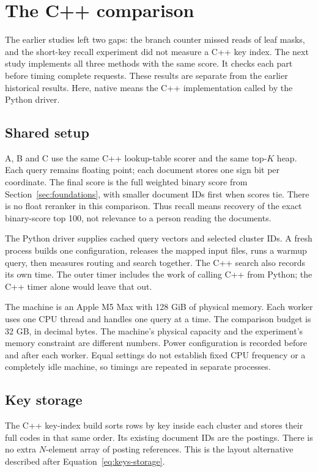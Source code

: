\section{The C++ comparison}
\label{sec:implemented-study}
The earlier studies left two gaps: the branch counter missed reads of leaf masks, and the
short-key recall experiment did not measure a C++ key index. The next study implements all
three methods with the same score. It checks each part before timing complete requests.
These results are separate from the earlier historical results. Here, native means the C++
implementation called by the Python driver.

\subsection{Shared setup}
A, B and C use the same C++ lookup-table scorer and the same top-$K$ heap. Each query remains
floating point; each document stores one sign bit per coordinate. The final score is the full
weighted binary score from Section~\ref{sec:foundations}, with smaller document IDs first when
scores tie. There is no float reranker in this comparison. Thus recall means recovery of the
exact binary-score top 100, not relevance to a person reading the documents.

The Python driver supplies cached query vectors and selected cluster IDs. A fresh process
builds one configuration, releases the mapped input files, runs a warmup query, then measures
routing and search together. The C++ search also records its own time. The outer timer includes
the work of calling C++ from Python; the C++ timer alone would leave that out.

The machine is an Apple M5 Max with 128 GiB of physical memory. Each worker uses one CPU
thread and handles one query at a time. The comparison budget is 32 GB, in decimal bytes.
The machine's physical capacity and the experiment's memory constraint are different numbers.
Power configuration is recorded before and after each worker. Equal settings do not establish
fixed CPU frequency or a completely idle machine, so timings are repeated in separate processes.

\subsection{Key storage}
The C++ key-index build sorts rows by key inside each cluster and stores their full codes in that
same order. Its existing document IDs are the postings. There is no extra $N$-element array of
posting references. This is the layout alternative described after Equation~\eqref{eq:keys-storage}.

